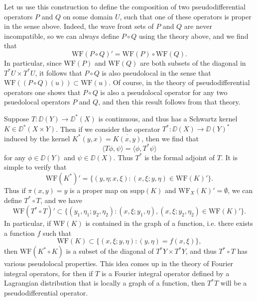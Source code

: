 \begin{example}
    Let us use this construction to define the composition of two pseudodifferential operators $P$ and $Q$ on some domain $U$, such that one of these operators is proper in the sense above. Indeed, the wave front sets of $P$ and $Q$ are never incompatible, so we can always define $P \circ Q$ using the theory above, and we find that
    \[ \text{WF}(P \circ Q)' = \text{WF}(P) \circ \text{WF}(Q). \]
    In particular, since $\text{WF}(P)$ and $\text{WF}(Q)$ are both subsets of the diagonal in $T^*U \times T^*U$, it follows that $P \circ Q$ is also pseudolocal in the sense that $\text{WF}((P \circ Q)(u)) \subset \text{WF}(u)$. Of course, in the theory of pseudodifferential operators one shows that $P \circ Q$ is also a pseudolocal operator for any two psuedolocal operators $P$ and $Q$, and then this result follows from that theory.
\end{example}

\begin{example}
    Suppose $T: \DD(Y) \to \DD^*(X)$ is continuous, and thus has a Schwartz kernel $K \in \DD^*(X \times Y)$. Then if we consider the operator $T^*: \DD(X) \to \DD(Y)^*$ induced by the kernel $K^*(y,x) = \overline{K(x,y)}$, then we find that
    \[ \langle T\phi, \psi \rangle = \langle \phi, T^* \psi \rangle \]
    for any $\phi \in \DD(Y)$ and $\psi \in \DD(X)$. Thus $T^*$ is the formal adjoint of $T$. It is simple to verify that
    \[ \text{WF}(K^*)' = \{ (y,\eta; x, \xi) : (x,\xi;y,\eta) \in \text{WF}(K)' \}. \]
    Thus if $\pi(x,y) = y$ is a proper map on $\text{supp}(K)$ and $\text{WF}_X(K)' = \emptyset$, we can define $T^* \circ T$, and we have
    \[ \text{WF}(T^* \circ T)' \subset \{ (y_1,\eta_1;y_2,\eta_2) : (x,\xi;y_1,\eta), (x,\xi;y_2,\eta_2) \in \text{WF}(K)' \}. \]
    In particular, if $\text{WF}(K)$ is contained in the graph of a function, i.e. there exists a function $f$ such that
    \[ \text{WF}(K) \subset \{ (x,\xi;y,\eta) : (y,\eta) = f(x,\xi) \}, \]
    then $\text{WF}(K^* \circ K)$ is a subset of the diagonal of $T^* Y \times T^* Y$, and thus $T^* \circ T$ has various pseudolocal properties. This idea comes up in the theory of Fourier integral operators, for then if $T$ is a Fourier integral operator defined by a Lagrangian distribution that is locally a graph of a function, then $T^* T$ will be a pseudodifferential operator.
\end{example}








